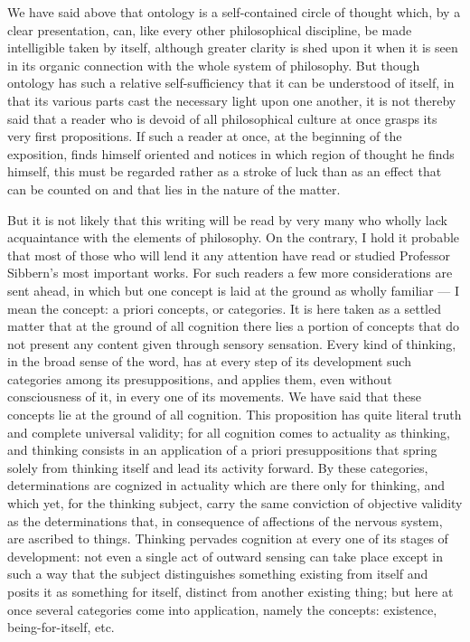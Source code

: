 \documentclass[12pt]{article}
\newcommand{\opage}[1]{\marginnote{\footnotesize\textit{[#1]}}}
\begin{document}
We have said above that ontology is a self-contained circle of thought which, by
a clear presentation, can, like every other philosophical discipline, be made
intelligible taken by itself, although greater clarity is shed upon it when it is
seen in its organic connection with the whole system of philosophy. But though
ontology has such a relative self-sufficiency that it can be understood of itself,
in that its various parts cast the necessary light upon one another, it is not
thereby said that a reader who is devoid of all philosophical culture at once
grasps its very first propositions. If such a reader at once, at the beginning of
the exposition, finds himself oriented and notices in which region of thought he
finds himself, this must be regarded rather as a stroke of luck than as an effect
that can be counted on and that lies in the nature of the matter.

But it is not likely that this writing will be read by very many who wholly lack
acquaintance with the elements of philosophy. On the contrary, I hold it probable
that most of those who will lend it any attention have read or
stu\opage{196}died Professor Sibbern's most important works. For such readers a
few more considerations are sent ahead, in which but one concept is laid at the
ground as wholly familiar --- I mean the concept: a priori concepts, or
categories. It is here taken as a settled matter that at the ground of all
cognition there lies a portion of concepts that do not present any content given
through sensory sensation. Every kind of thinking, in the broad sense of the word,
has at every step of its development such categories among its presuppositions,
and applies them, even without consciousness of it, in every one of its movements.
We have said that these concepts lie at the ground of all cognition. This
proposition has quite literal truth and complete universal validity; for all
cognition comes to actuality as thinking, and thinking consists in an application
of a priori presuppositions that spring solely from thinking itself and lead its
activity forward. By these categories, determinations are cognized in actuality
which are there only for thinking, and which yet, for the thinking subject, carry
the same conviction of objective validity as the determinations that, in
consequence of affections of the nervous system, are ascribed to things. Thinking
pervades cognition at every one of its stages of development: not even a single
act of outward sensing can take place except in such a way that the subject
distinguishes something existing from itself and posits it as something for
itself, distinct from another existing thing; but here at once several categories
come into application, namely the concepts: existence, being-for-itself, etc.
\end{document}
